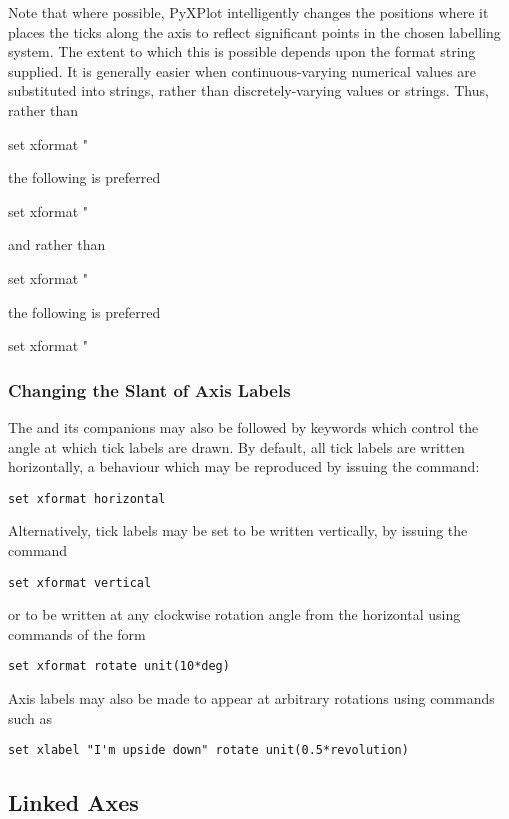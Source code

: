 Note that where possible, PyXPlot intelligently changes the positions where it
places the ticks along the axis to reflect significant points in the chosen
labelling system.  The extent to which this is possible depends upon the format
string supplied. It is generally easier when continuous-varying numerical
values are substituted into strings, rather than discretely-varying values or
strings. Thus, rather than
\begin{dontdo}
set xformat "%
\end{dontdo}
the following is preferred
\begin{dontdo}
set xformat "%
\end{dontdo}
and rather than
\begin{dontdo}
set xformat "%
\end{dontdo}
the following is preferred
\begin{dontdo}
set xformat "%
\end{dontdo}

\subsubsection{Changing the Slant of Axis Labels}

The  and its companions may also be followed by keywords
which control the angle at which tick labels are drawn. By default, all tick
labels are written horizontally, a behaviour which may be reproduced by issuing
the command:
\begin{verbatim}
set xformat horizontal
\end{verbatim}
Alternatively, tick labels may be set to be written vertically, by issuing the command
\begin{verbatim}
set xformat vertical
\end{verbatim}
or to be written at any clockwise rotation angle from the horizontal using commands of the form
\begin{verbatim}
set xformat rotate unit(10*deg)
\end{verbatim}

Axis labels may also be made to appear at arbitrary rotations using commands such as
\begin{verbatim}
set xlabel "I'm upside down" rotate unit(0.5*revolution)
\end{verbatim}

\subsection{Linked Axes}
\label{sec:linked_axes}

